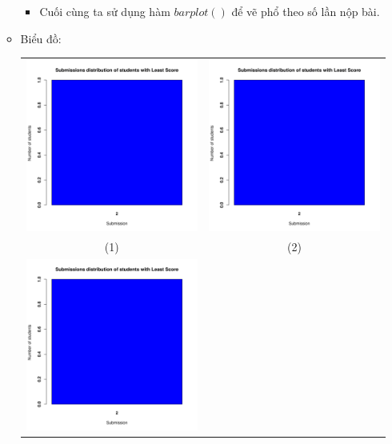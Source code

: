 \documentclass[a4paper]{article}
\theoremstyle{definition}
\begin{document}
\begin{enumerate}[a)]
\begin{itemize}
\begin{itemize}
\begin{center}
\begin{tabular}{p{13cm}}
                \end{tabular}
            \end{center}
            \item Cuối cùng ta sử dụng hàm $barplot()$ để vẽ phổ theo số lần nộp bài.
        \end{itemize}
        \item Biểu đồ:\\
        \begin{center}
            \begin{tabular}{c c}
                 \includegraphics[width = 6.9cm]{Images/img2-1-1.png} & \includegraphics[width = 6.9cm]{Images/img2-1-2.png} \\
                 (1) & (2) \\
                 \includegraphics[width = 6.9cm]{Images/img2-1-3.png} &

\end{tabular}
\end{center}
\end{itemize}
\end{enumerate}
\end{document}
